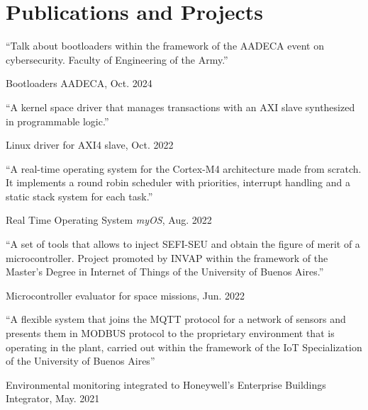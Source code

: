 \section{Publications and Projects}
\vspace{2em}

\begingroup\setlength{\parskip}{0.5em}

\newcommand{\pub}[5]{
	\parbox[t][][t]{\linewidth}{%
		\begin{small}
		\parbox{\linewidth}{{``#4''}}
		\parbox{\linewidth}{{#2}, {#1}}
		\parbox{\linewidth}{{\href{https://doi.org/#3}{#3}}}
		\end{small}
	}
}

\pub{Oct. 2024}{Bootloaders AADECA}{}{Talk about bootloaders within the framework of the AADECA event on cybersecurity. Faculty of Engineering of the Army.}{
}

\pub{Oct. 2022}{Linux driver for AXI4 slave}{}{A kernel space driver that manages transactions with an AXI slave synthesized in programmable logic.}{
}

\pub{Aug. 2022}{Real Time Operating System \emph{myOS}}{}{A real-time operating system for the Cortex-M4 architecture made from scratch. It implements a round robin scheduler with priorities, interrupt handling and a static stack system for each task.}{
}

\pub{Jun. 2022}{Microcontroller evaluator for space missions}{}{A set of tools that allows to inject SEFI-SEU and obtain the figure of merit of a microcontroller. Project promoted by INVAP within the framework of the Master's Degree in Internet of Things of the University of Buenos Aires.}{
}

\pub{May. 2021}{Environmental monitoring integrated to Honeywell's Enterprise Buildings Integrator}{}{A flexible system that joins the MQTT protocol for a network of sensors and presents them in MODBUS protocol to the proprietary environment that is operating in the plant, carried out within the framework of the IoT Specialization of the University of Buenos Aires}{
}

\endgroup


